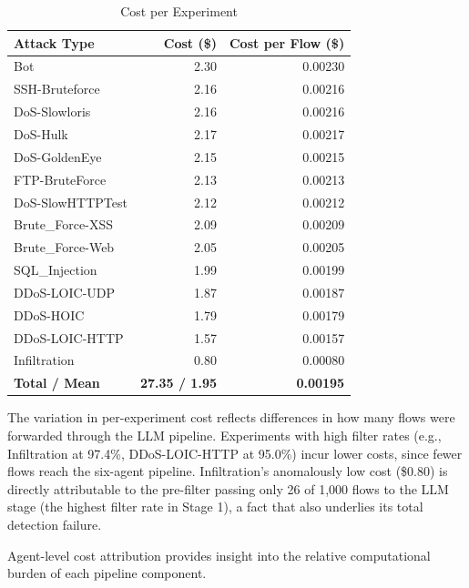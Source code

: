 \begin{table}[H]
\centering
\caption{Cost per Experiment}
\label{tab:cost-per-experiment}
\begin{tabular}{l r r}
\toprule
Attack Type & Cost (\$) & Cost per Flow (\$) \\
\midrule
Bot & 2.30 & 0.00230 \\
SSH-Bruteforce & 2.16 & 0.00216 \\
DoS-Slowloris & 2.16 & 0.00216 \\
DoS-Hulk & 2.17 & 0.00217 \\
DoS-GoldenEye & 2.15 & 0.00215 \\
FTP-BruteForce & 2.13 & 0.00213 \\
DoS-SlowHTTPTest & 2.12 & 0.00212 \\
Brute\_Force-XSS & 2.09 & 0.00209 \\
Brute\_Force-Web & 2.05 & 0.00205 \\
SQL\_Injection & 1.99 & 0.00199 \\
DDoS-LOIC-UDP & 1.87 & 0.00187 \\
DDoS-HOIC & 1.79 & 0.00179 \\
DDoS-LOIC-HTTP & 1.57 & 0.00157 \\
Infiltration & 0.80 & 0.00080 \\
\midrule
\textbf{Total / Mean} & \textbf{27.35 / 1.95} & \textbf{0.00195} \\
\bottomrule
\end{tabular}
\end{table}

The variation in per-experiment cost reflects differences in how many flows were forwarded through the LLM pipeline. Experiments with high filter rates (e.g., Infiltration at 97.4\%, DDoS-LOIC-HTTP at 95.0\%) incur lower costs, since fewer flows reach the six-agent pipeline. Infiltration's anomalously low cost (\$0.80) is directly attributable to the pre-filter passing only 26 of 1,000 flows to the LLM stage (the highest filter rate in Stage 1), a fact that also underlies its total detection failure.

Agent-level cost attribution provides insight into the relative computational burden of each pipeline component.

